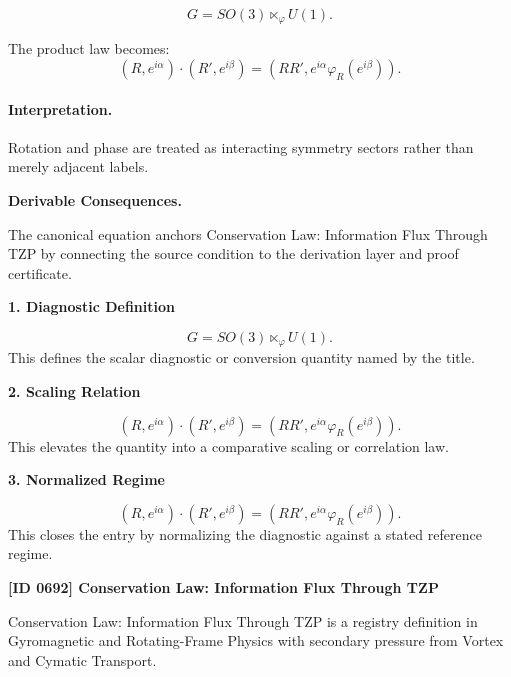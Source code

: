 \begin{equation}
G=SO(3)\ltimes_{\varphi}U(1).
\end{equation}

The product law becomes:
\begin{equation}
\boxed{
(R,e^{i\alpha})\cdot(R',e^{i\beta})
=
\left(
RR',
e^{i\alpha}\varphi_R(e^{i\beta})
\right).
}
\end{equation}

\paragraph{Interpretation.}
Rotation and phase are treated as interacting symmetry sectors rather than merely adjacent labels.

\par\vspace{0.35em}
\noindent\textbf{Derivable Consequences.}\quad
\begingroup
\footnotesize
\raggedright
The canonical equation anchors Conservation Law: Information Flux Through TZP by connecting the source condition to the derivation layer and proof certificate.
\par\endgroup

\noindent\textbf{1. Diagnostic Definition}\par
\[
G=SO(3)\ltimes_{\varphi} U(1).
\]
\noindent This defines the scalar diagnostic or conversion quantity named by the title.\par
\noindent\textbf{2. Scaling Relation}\par
\[
(R,e^{i\alpha})\cdot(R',e^{i\beta}) = \left( RR', e^{i\alpha}\varphi_R(e^{i\beta}) \right).
\]
\noindent This elevates the quantity into a comparative scaling or correlation law.\par
\noindent\textbf{3. Normalized Regime}\par
\[
\boxed{ (R,e^{i\alpha})\cdot(R',e^{i\beta}) = \left( RR', e^{i\alpha}\varphi_R(e^{i\beta}) \right). }
\]
\noindent This closes the entry by normalizing the diagnostic against a stated reference regime.\par

\clearpage
\noindent\textbf{[ID 0692] Conservation Law: Information Flux Through TZP}\par
\vspace{0.35em}
\begingroup\small
{}
Conservation Law: Information Flux Through TZP is a registry definition in Gyromagnetic and Rotating-Frame Physics with secondary pressure from Vortex and Cymatic Transport.

